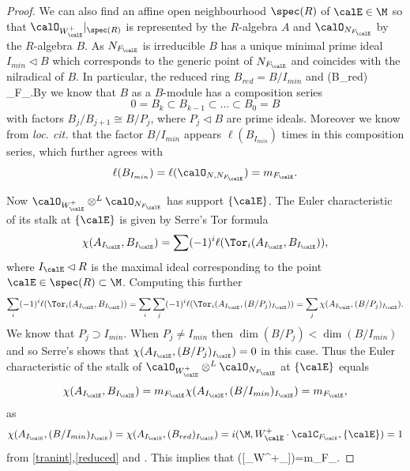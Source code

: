 \begin{proof}
	We can also find an affine open neighbourhood $\spec(R)$  of $\calE\in \M$ so that $\calO_{W^+_\calE}|_{\spec(R)}$ is represented by the $R$-algebra $A$ and $\calO_{N_{F_\calE}}$ by the $R$-algebra $B$. As ${N_{F_\calE}}$ is irreducible $B$ has a unique minimal prime ideal $I_{min}\lhd B$ which corresponds to the generic point of ${N_{F_\calE}}$ and coincides with the nilradical of $B$. In particular, the reduced ring $B_{red}=B/I_{min}$ and \beq\label{reduced}\spec (B_{red}) \cong \calC_{F_{\calE}}.\eeq  By \cite[Theorem 2 of IV.1.4]{bourbaki} %
	we know that $B$ as a $B$-module has a composition series $$0=B_k\subset B_{k-1} \subset \dots\subset B_0=B$$ with factors $B_j/{B_{j+1}}\cong B/P_j$, where $P_j\lhd B$ are prime ideals. Moreover we know from  {\em loc. cit.} that the factor $B/I_{min}$ appears $\ell(B_{I_{min}})$ times in this composition series, which further agrees with $$\ell(B_{I_{min}})=\ell(\calO_{N,N_{{F_\calE}}})=m_{F_\calE}.$$

	Now $\calO_{W^+_\calE}\otimes^L \calO_{N_{F_\calE}}$ has support $\{\calE\}$. The Euler characteristic of its stalk at $\{\calE\}$ is given by Serre's Tor formula
	$$\chi(A_{I_\calE},B_{I_\calE})=\sum (-1)^i \ell(\Tor_i(A_{I_\calE},B_{I_\calE})),$$
	where $I_\calE\lhd R$ is the maximal ideal corresponding to the point $\calE\in \spec(R)\subset \M$. Computing this further
	$$\sum_i (-1)^i \ell(\Tor_i(A_{I_\calE},B_{I_\calE}))=\sum_i \sum_j (-1)^i \ell(\Tor_i(A_{I_\calE},(B/P_j)_{I_\calE}))=\sum_j \chi(A_{I_\calE},(B/P_j)_{I_\calE}).$$
	We know that $P_j\supset I_{min}$. When $P_j\neq I_{min}$ then $\dim(B/P_j)<\dim(B/I_{min})$ and so Serre's \cite[Theorem C.1.1.a]{serre} shows that $\chi(A_{I_\calE},(B/P_j)_{I_\calE})=0$ in this case. Thus  the Euler characteristic of the stalk of $\calO_{W^+_\calE}\otimes^L \calO_{N_{F_\calE}}$ at $\{\calE\}$ equals $$\chi(A_{I_\calE},B_{I_\calE})=m_{F_\calE} \chi(A_{I_\calE},(B/I_{min})_{I_\calE})=m_{F_\calE},$$
	as $$\chi(A_{I_\calE},(B/I_{min})_{I_\calE})=\chi(A_{I_\calE},(B_{red})_{I_\calE})=i(\M,W^+_\calE\cdot \calC_{F_\calE},\{\calE\})=1$$ from \eqref{tranint},\eqref{reduced} and \cite[Theorem C.1.1.b]{serre}. This  implies  that \beq \label{intermult}\chi([\calO_{W^+_\calE}]\cap [\calO_{N}])=m_{F_\calE}.\eeq
{}







\end{proof}
